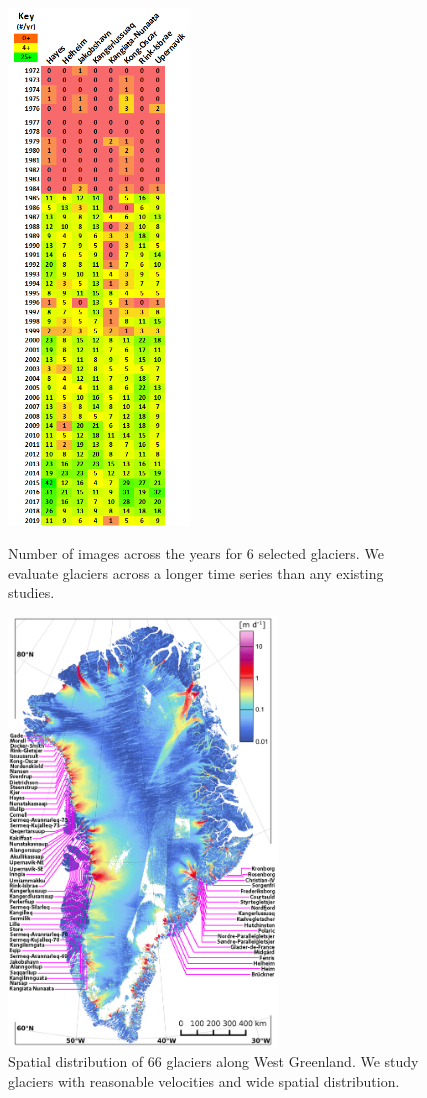\documentclass[tc, manuscript]{copernicus}
\begin{document}
\begin{figure}
    \noindent
    \begin{minipage}{4.8cm}
        \includegraphics[width=4.8cm]{temporal.png}
        \caption{Number of images across the years for 6 selected glaciers. We evaluate glaciers across a longer time series than any existing studies.}
    \end{minipage}
    \hspace{0.15cm}
    \begin{minipage}{7.15cm}
        \centering
        \includegraphics[width=7.15cm]{spatial_66.png}
        \caption{Spatial distribution of 66 glaciers along West Greenland. We study glaciers with reasonable velocities and wide spatial distribution.}
    \end{minipage}
\end{figure}
\end{document}
